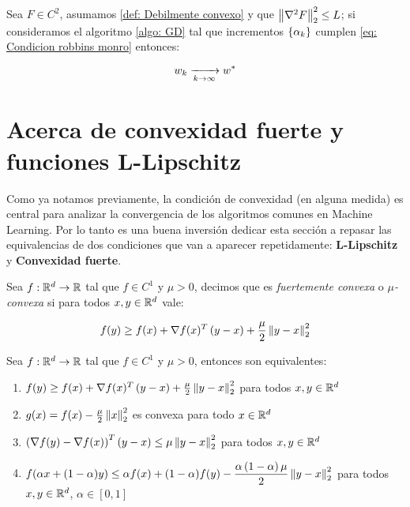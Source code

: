 \begin{corollary}
	Sea $F \in C^2$, asumamos \ref{def: Debilmente convexo} y que $\left\lVert\nabla^2 F\right\rVert_2^2 \leq L$; si consideramos el algoritmo \ref{algo: GD} tal que incrementos $\left\lbrace\alpha_k\right\rbrace$  cumplen \ref{eq: Condicion robbins monro} entonces:
	
	\begin{equation}
	w_k \xrightarrow[k \rightarrow \infty]{} w^*
	\end{equation}
\end{corollary}

\section{Acerca de convexidad fuerte y funciones L-Lipschitz}

Como ya notamos previamente, la condici\'on de convexidad (en alguna medida) es central para analizar la convergencia de los algoritmos comunes en Machine Learning. Por lo tanto es una buena inversi\'on dedicar esta secci\'on a repasar las equivalencias de dos condiciones que van a aparecer repetidamente: \textbf{L-Lipschitz} y \textbf{Convexidad fuerte}.

\begin{definition}
	\label{def: Fuertemente convexa}
	Sea $f:{\mathbb{R}}^d \rightarrow {\mathbb{R}}$ tal que $f \in C^1$ y $\mu >0$, decimos que es \textit{fuertemente convexa} o $\mu$\textit{-convexa} si para todos $x,y \in {\mathbb{R}}^d$ vale:
	
	\begin{equation}
		f(y) \geq f(x) + \nabla f(x)^T\left(y-x\right) + \frac{\mu}{2} \left\lVert y-x\right\rVert_2^2
	\end{equation}
\end{definition}

\begin{proposition}
	\label{prop: equivalencias convexidad fuerte}
	Sea $f:{\mathbb{R}}^d \rightarrow {\mathbb{R}}$ tal que $f \in C^1$ y $\mu >0$, entonces son equivalentes:
	\begin{enumerate}
		\item $f(y) \geq f(x) + \nabla f(x)^T\left(y-x\right) + \frac{\mu}{2} \left\lVert y-x\right\rVert_2^2$ para todos $x,y \in {\mathbb{R}}^d$
		\item $g(x) = f(x) - \frac{\mu}{2} \left\lVert x\right\rVert_2^2$ es convexa para todo $x \in {\mathbb{R}}^d$
		\item $\left(\nabla f(y) - \nabla f(x)\right)^T \left(y-x\right) \leq \mu \left\lVert y-x\right\rVert_2^2$ para todos $x,y \in {\mathbb{R}}^d$
		\item $f(\alpha x + (1-\alpha)y) \leq \alpha f(x) + (1-\alpha) f(y) - \dfrac{\alpha \left(1 - \alpha \right) \mu}{2}\left\lVert y-x\right\rVert_2^2$ para  todos $x,y \in {\mathbb{R}}^d$, $\alpha \in [0,1]$
	\end{enumerate}
\end{proposition}

